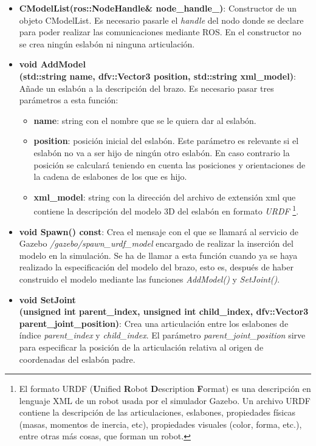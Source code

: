 \documentclass[12pt, a4paper]{report}
\begin{document}
\begin{itemize}

\item \textbf{CModelList(ros::NodeHandle\& node\_handle\_)}: Constructor de un objeto CModelList. Es necesario pasarle el \textit{handle} del nodo donde se declare para poder realizar las comunicaciones mediante ROS. En el constructor no se crea ningún eslabón ni ninguna articulación.

\item \textbf{void AddModel}\\
\textbf{(std::string name, dfv::Vector3 position, std::string xml\_model)}: Añade un eslabón a la descripción del brazo. Es necesario pasar tres parámetros a esta función:

	\begin{itemize}
	\item \textbf{name}: string con el nombre que se le quiera dar al eslabón.
	\item \textbf{position}: posición inicial del eslabón. Este parámetro es relevante si el eslabón no va a ser hijo de ningún otro eslabón. En caso contrario la posición se calculará teniendo en cuenta las posiciones y orientaciones de la cadena de eslabones de los que es hijo.
	\item \textbf{xml\_model}: string con la dirección del archivo de extensión xml que contiene la descripción del modelo 3D del eslabón en formato \textit{URDF} \footnote{El formato URDF (\textbf{U}nified \textbf{R}obot \textbf{D}escription \textbf{F}ormat) es una descripción en lenguaje XML de un robot usada por el simulador Gazebo. Un archivo URDF contiene la descripción de las articulaciones, eslabones, propiedades físicas (masas, momentos de inercia, etc), propiedades visuales (color, forma, etc.), entre otras más cosas, que forman un robot.}.
	\end{itemize}

\item \textbf{void Spawn() const}: Crea el mensaje con el que se llamará al servicio de Gazebo \textit{/gazebo/spawn\_urdf\_model} encargado de realizar la inserción del modelo en la simulación. Se ha de llamar a esta función cuando ya se haya realizado la especificación del modelo del brazo, esto es, después de haber construido el modelo mediante las funciones \textit{AddModel()} y \textit{SetJoint()}.

\item \textbf{void SetJoint}\\
\textbf{(unsigned int parent\_index, unsigned int child\_index, dfv::Vector3 parent\_joint\_position)}: Crea una articulación entre los eslabones de índice \textit{parent\_index} y \textit{child\_index}. El parámetro \textit{parent\_joint\_position} sirve para especificar la posición de la articulación relativa al origen de coordenadas del eslabón padre.


\end{itemize}
\end{document}
